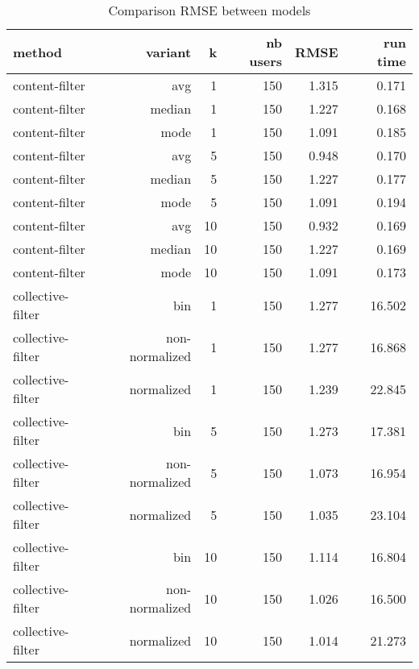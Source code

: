 \begin{table}[!ht]
    \centering
    \caption{Comparison RMSE between models}
    \begin{tabular}{lrrrrr}
    \hline
        \textbf{method} & \textbf{variant} & \textbf{k} & \textbf{nb users} & \textbf{RMSE} & \textbf{run time} \\ \hline
        \rowcolor{pink}
        content-filter & avg & 1 & 150 & 1.315 & 0.171 \\ 
        content-filter & median & 1 & 150 & 1.227 & 0.168 \\ 
        content-filter & mode & 1 & 150 & 1.091 & 0.185 \\ 
        content-filter & avg & 5 & 150 & 0.948 & 0.170 \\ 
        content-filter & median & 5 & 150 & 1.227 & 0.177 \\ 
        content-filter & mode & 5 & 150 & 1.091 & 0.194 \\ 
        \rowcolor{yellow} 
        content-filter & avg & 10 & 150 & 0.932 & 0.169 \\ 
        content-filter & median & 10 & 150 & 1.227 & 0.169 \\ 
        content-filter & mode & 10 & 150 & 1.091 & 0.173 \\ \hline
        \rowcolor{pink}
        collective-filter & bin & 1 & 150 & 1.277 & 16.502 \\ 
        collective-filter & non-normalized & 1 & 150 & 1.277 & 16.868 \\ 
        collective-filter & normalized & 1 & 150 & 1.239 & 22.845 \\ 
        collective-filter & bin & 5 & 150 & 1.273 & 17.381 \\ 
        collective-filter & non-normalized & 5 & 150 & 1.073 & 16.954 \\ 
        collective-filter & normalized & 5 & 150 & 1.035 & 23.104 \\ 
        collective-filter & bin & 10 & 150 & 1.114 & 16.804 \\ 
        \rowcolor{yellow}
        collective-filter & non-normalized & 10 & 150 & 1.026 & 16.500 \\ 
        collective-filter & normalized & 10 & 150 & 1.014 & 21.273 \\ \hline
    \end{tabular}
    \label{tab:result}
\end{table}